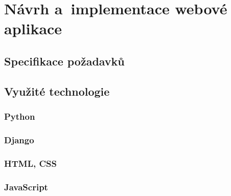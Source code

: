 



\chapter{Návrh a~implementace webové aplikace}

\dummyText


\section{Specifikace požadavků}

\dummyText

\dummyText


\section{Využité technologie}

\dummyShortText[9]


\subsection*{Python}

\dummyText[2]


\subsection*{Django}

\dummyShortText[13]

\dummyText


\subsection*{HTML, CSS}

\dummyText


\subsection*{JavaScript}

